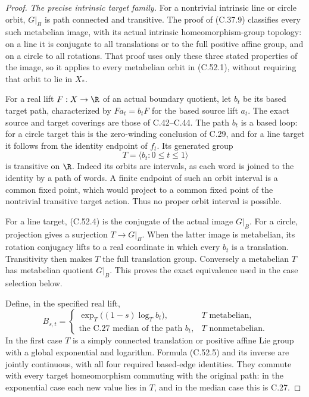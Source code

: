 \begin{proof}
\emph{The precise intrinsic target family.}
For a nontrivial intrinsic line or circle orbit, $G|_B$ is
path connected and transitive. The proof of (C.37.9)
classifies every such metabelian image, with its actual
intrinsic homeomorphism-group topology: on a line it is
conjugate to all translations or to the full positive
affine group, and on a circle to all rotations.
That proof uses only these three stated properties of
the image, so it applies to every metabelian orbit in
(C.52.1), without requiring that orbit to lie in $X_*$.

For a real lift $F:X\to\R$ of an actual boundary quotient,
let $b_t$ be its based target path, characterized by
$Fa_t=b_tF$ for the based source lift $a_t$.
The exact source and target coverings are those of
C.42--C.44. The path $b_t$ is a based loop: for a circle
target this is the zero-winding conclusion of C.29,
and for a line target it follows from the identity
endpoint of $f_t$.
Its generated group
\[
                         T=\langle b_t:0\leq t\leq1\rangle
                                                               \tag{C.52.4}
\]
is transitive on $\R$. Indeed its orbits are intervals,
as each word is joined to the identity by a path of
words. A finite endpoint of such an orbit interval is
a common fixed point, which would project to a common
fixed point of the nontrivial transitive target action.
Thus no proper orbit interval is possible.

For a line target, (C.52.4) is the conjugate of the
actual image $G|_B$. For a circle, projection gives a
surjection $T\to G|_B$. When the latter image is
metabelian, its rotation conjugacy lifts to a real
coordinate in which every $b_t$ is a translation.
Transitivity then makes $T$ the full translation group.
Conversely a metabelian $T$ has metabelian quotient
$G|_B$. This proves the exact equivalence used in the
case selection below.

Define, in the specified real lift,
\[
 B_{s,t}=
 \begin{cases}
 \exp_T\bigl((1-s)\log_T b_t\bigr),&T\text{ metabelian},\\
 \text{the C.27 median of the path }b_t,&T\text{ nonmetabelian}.
 \end{cases}                                             \tag{C.52.5}
\]
In the first case $T$ is a simply connected translation
or positive affine Lie group with a global exponential
and logarithm. Formula (C.52.5) and its inverse are
jointly continuous, with all four required based-edge
identities. They commute with every target homeomorphism
commuting with the original path: in the exponential
case each new value lies in $T$, and in the median case
this is C.27.


\end{proof}
